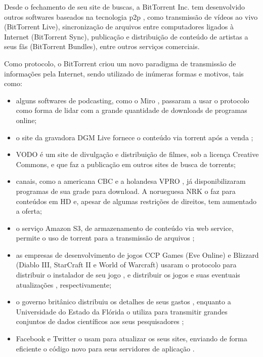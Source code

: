 Desde o fechamento de seu site de buscas, a BitTorrent Inc. tem desenvolvido outros
softwares baseados na tecnologia \gls*{p2p} \cite{site:bittorrent}, como transmissão de
vídeos ao vivo (BitTorrent Live), sincronização de arquivos entre computadores ligados
à Internet (BitTorrent Sync), publicação e distribuição de conteúdo de artistas a seus
fãs (BitTorrent Bundles), entre outros serviços comerciais.

Como protocolo, o BitTorrent criou um novo paradigma de transmissão de informações pela
Internet, sendo utilizado de inúmeras formas e motivos, tais como:

\begin{itemize}
    \item alguns softwares de podcasting, como o Miro \cite{site:miro}, passaram a
        usar o protocolo como forma de lidar com a grande quantidade de downloads de
        programas online;

    \item o site da gravadora DGM Live fornece o conteúdo via torrent após a venda
        \cite{site:dgm};

    \item VODO \cite{site:vodo} é um site de divulgação e distribuição de filmes, sob a
        licença Creative Commons, e que faz a publicação em outros sites de busca de
        \glspl*{torrent};

    \item canais, como a americana CBC \cite{site:cbc} e a holandesa VPRO
        \cite{site:vpro}, já disponibilizaram programas de sua grade para download. A
        norueguesa NRK o faz para conteúdos em HD \cite{site:nrk} e, apesar de algumas
        restrições de direitos, tem aumentado a oferta;

    \item o serviço Amazon S3, de armazenamento de conteúdo via web service, permite o
        uso de torrent para a transmissão de arquivos \cite{site:aws-s3};

    \item as empresas de desenvolvimento de jogos CCP Games (Eve Online) e Blizzard
        (Diablo III, StarCraft II e World of Warcraft) usaram o protocolo para
        distribuir o instalador de seu jogo \cite{site:eve}, e distribuir os jogos e
        suas eventuais atualizações \cite{site:blizzard}, respectivamente;

    \item o governo britânico distribuiu os detalhes de seus gastos \cite{site:gov-uk},
        enquanto a Universidade do Estado da Flórida o utiliza para transmitir grandes
        conjuntos de dados científicos aos seus pesquisadores \cite{site:univ-fl};

    \item Facebook \cite{site:facebook-torrent} e Twitter \cite{site:twitter-torrent}
        o usam para atualizar os seus sites, enviando de forma eficiente o código novo
        para seus servidores de aplicação \cite{site:twitter-torrent-power}.
\end{itemize}


